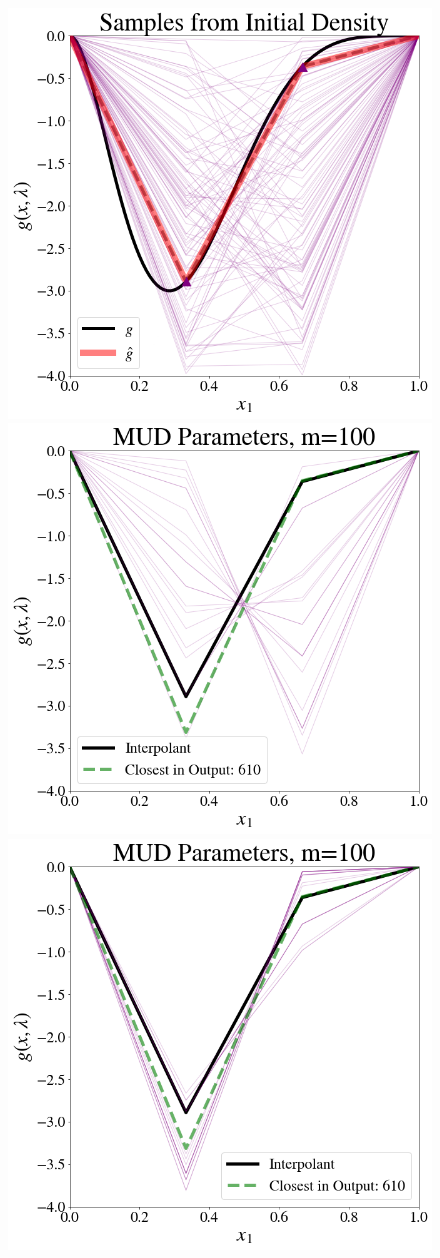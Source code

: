\begin{frame}
\begin{figure}
\centering
    \includegraphics[width=0.325\linewidth]{figures/pde-highd/pde-highd_init_D2.png}
    \includegraphics[width=0.325\linewidth]{figures/pde-highd/pde-highd_pair_D2-1_m100.png}
    \includegraphics[width=0.325\linewidth]{figures/pde-highd/pde-highd_pair_D2-2_m100.png}
\label{fig:pde-MUD}
\end{figure}
\end{frame}
